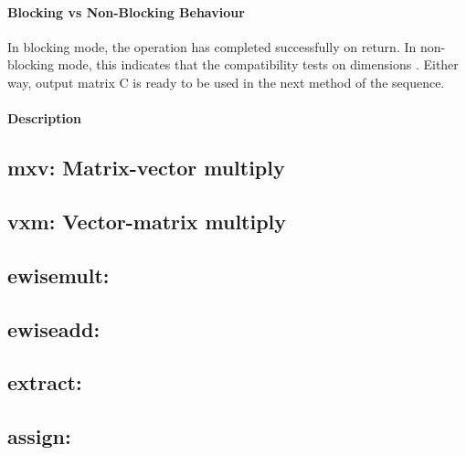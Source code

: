 \paragraph{Blocking vs Non-Blocking Behaviour}

In blocking mode, the operation has completed successfully on return.
In non-blocking mode, this indicates that the compatibility 
tests on dimensions . 
Either way, output matrix {\sf C} is ready to be used in the next method of
the sequence.

\paragraph{Description}

\subsection{{\sf mxv}: Matrix-vector multiply}

\subsection{{\sf vxm}: Vector-matrix multiply}


\subsection{{\sf ewisemult}: }

\subsection{{\sf ewiseadd}: }

\subsection{{\sf extract}: }

\subsection{{\sf assign}: }

